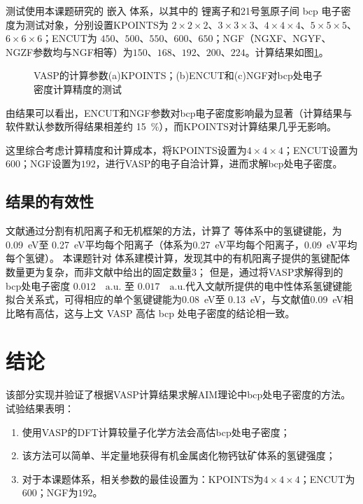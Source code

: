 测试使用本课题研究的 嵌入 体系，以其中的 锂离子和21号氢原子间 bcp 电子密度为测试对象，分别设置KPOINTS为 $2 \times 2 \times 2$、$3 \times 3 \times 3$、$4 \times 4 \times 4$、$5 \times 5 \times 5$、$6 \times 6 \times 6$；ENCUT为 $450$、$500$、$550$、$600$、$650$；NGF（NGXF、NGYF、NGZF参数均与NGF相等）为$150$、$168$、$192$、$200$、$224$。计算结果如图\ref{fig:bcp-test2}。

\begin{figure}[htbp]
    \centering
    \caption{VASP的计算参数(a)KPOINTS；(b)ENCUT和(c)NGF对bcp处电子密度计算精度的测试}
    \label{fig:bcp-test2}
\end{figure}


由结果可以看出，ENCUT和NGF参数对bcp电子密度影响最为显著（计算结果与软件默认参数所得结果相差约 \SI{15}{\percent}），而KPOINTS对计算结果几乎无影响。

这里综合考虑计算精度和计算成本，将KPOINTS设置为$4 \times 4 \times 4$；ENCUT设置为$600$；NGF设置为$192$，进行VASP的电子自洽计算，进而求解bcp处电子密度。

\subsection{结果的有效性}

文献\cite{svaneHowStrongHydrogen2017}通过分割有机阳离子和无机框架的方法，计算了  等体系中的氢键键能，为 \SI{0.09}{eV}至 \SI{0.27}{eV}平均每个阳离子（体系为\SI{0.27}{eV}平均每个阳离子，\SI{0.09}{eV}平均每个氢键）。
本课题针对  体系建模计算，发现其中的有机阳离子提供的氢键配体数量更为复杂，而非文献\cite{svaneHowStrongHydrogen2017}中给出的固定数量3；
但是，通过将VASP求解得到的 bcp处电子密度 $0.012 \quad \mathrm{a.u.}$ 至 $0.017 \quad \mathrm{a.u.}$代入文献\cite{emamianExploringNaturePredicting2019}所提供的电中性体系氢键键能拟合关系式，可得相应的单个氢键键能为\SI{0.08}{eV}至 \SI{0.13}{eV}，与文献值\cite{svaneHowStrongHydrogen2017}\SI{0.09}{eV}相比略有高估，这与上文 VASP 高估 bcp 处电子密度的结论相一致。

\section{结论}

该部分实现并验证了根据VASP计算结果求解AIM理论中bcp处电子密度的方法。
试验结果表明：
\begin{enumerate}
    \item 使用VASP的DFT计算较量子化学方法会高估bcp处电子密度；
    \item 该方法可以简单、半定量地获得有机金属卤化物钙钛矿体系的氢键强度；
    \item 对于本课题体系，相关参数的最佳设置为：KPOINTS为$4 \times 4 \times 4$；ENCUT为$600$；NGF为$192$。
\end{enumerate}
